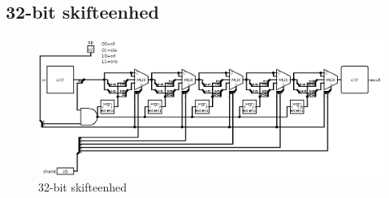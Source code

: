 \documentclass[10pt,a4paper,danish]{article}
\begin{document}
\subsection{32-bit skifteenhed}
\begin{figure}[htb]
\begin{center}
\leavevmode
\includegraphics[scale=0.45]{circ3.png}
\end{center}
\caption{32-bit skifteenhed}
\label{fig:circ3}
\end{figure}
\end{document}
